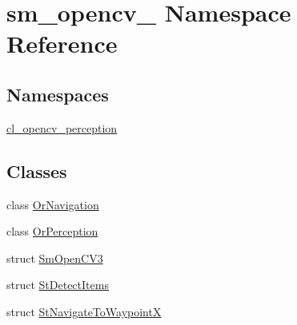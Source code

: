 \hypertarget{namespacesm__opencv__3}{}\section{sm\+\_\+opencv\+\_ Namespace Reference}
\label{namespacesm__opencv__3}
\subsection*{Namespaces}
\begin{DoxyCompactItemize}
\item 
 \hyperlink{namespacesm__opencv__3_1_1cl__opencv__perception}{cl\+\_\+opencv\+\_\+perception}
\end{DoxyCompactItemize}
\subsection*{Classes}
\begin{DoxyCompactItemize}
\item 
class \hyperlink{classsm__opencv__3_1_1OrNavigation}{Or\+Navigation}
\item 
class \hyperlink{classsm__opencv__3_1_1OrPerception}{Or\+Perception}
\item 
struct \hyperlink{structsm__opencv__3_1_1SmOpenCV3}{Sm\+Open\+C\+V3}
\item 
struct \hyperlink{structsm__opencv__3_1_1StDetectItems}{St\+Detect\+Items}
\item 
struct \hyperlink{structsm__opencv__3_1_1StNavigateToWaypointX}{St\+Navigate\+To\+WaypointX}
\end{DoxyCompactItemize}
